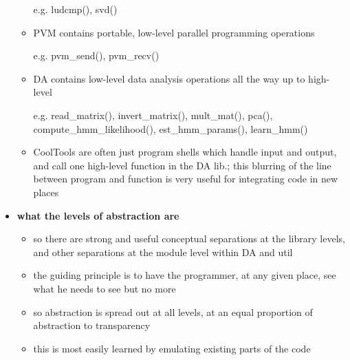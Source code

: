 \begin{itemize}
\begin{itemize}
			e.g. ludcmp(), svd()
	\item PVM contains portable, low-level parallel programming operations

			e.g. pvm\_send(), pvm\_recv()
	\item DA contains low-level data analysis operations all the way up to high-
			level

			e.g. read\_matrix(), invert\_matrix(), mult\_mat(), pca(), 
				compute\_hmm\_likelihood(), est\_hmm\_params(), learn\_hmm()
	\item CoolTools are often just program shells which handle input and output,
			and call one high-level function in the DA lib.; this blurring of
			the line between program and function is very useful for integrating
			code in new places
	\end{itemize}

\item {\bf what the levels of abstraction are}
	\begin{itemize}
	\item so there are strong and useful conceptual separations at the library
			levels, and other separations at the module level within DA and util
	\item the guiding principle is to have the programmer, at any given place,
			see what he needs to see but no more
	\item so abstraction is spread out at all levels, at an equal proportion of
			abstraction to transparency
	\item this is most easily learned by emulating existing parts of the code
	\end{itemize}


\end{itemize}
